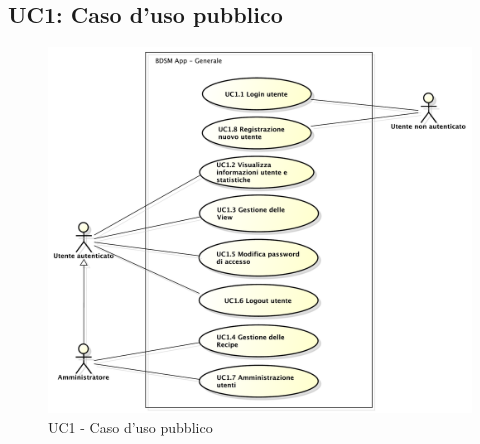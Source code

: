 \subsection{UC1: Caso d'uso pubblico}

\begin{figure}[htbp]
    \centering
    \centerline{\includegraphics[scale=0.45]{./images/UC1.pdf}}
    \caption{UC1 - Caso d'uso pubblico}
\end{figure}

